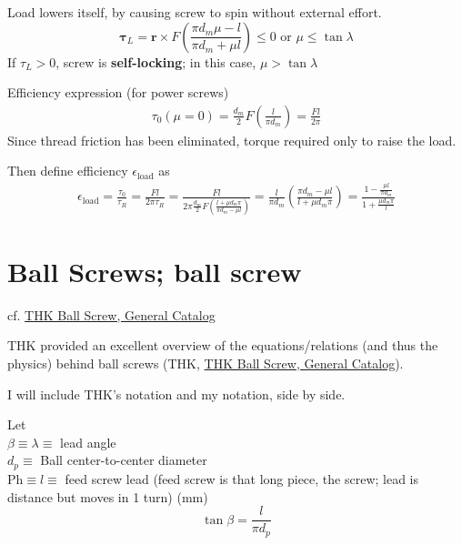 \documentclass[10pt]{amsart}
\begin{document}
\begin{multicols*}{2}
Load lowers itself, by causing screw to spin without external effort.  
\begin{equation}
	\mathbf{\tau}_L  = \mathbf{r} \times F \left( \frac{ \pi d_m \mu - l }{ \pi d_m + \mu l } \right)  \leq 0 \text{ or } \mu \leq \tan{\lambda} 
\end{equation}
If $\tau_L >0$, screw is \textbf{self-locking}; in this case, $\mu > \tan{\lambda}$

Efficiency expression (for power screws)
\begin{equation}
\begin{gathered}
	\tau_0(\mu = 0)  = \frac{d_m}{2} F\left( \frac{l }{ \pi d_m} \right)  = \frac{Fl}{2\pi }
\end{gathered}
\end{equation}
Since thread friction has been eliminated, torque required only to raise the load.  

Then define efficiency $\epsilon_{\text{load}}$ as 
\begin{equation}
\begin{gathered}
	\epsilon_{\text{load}} = \frac{ \tau_0 }{ \tau_R} = \frac{Fl}{2\pi \tau_R} = \frac{Fl}{ 2\pi  \frac{d_m}{2} F \left( \frac{ l + \mu d_m \pi }{ \pi d_m - \mu l } \right) } = \frac{l}{ \pi d_m} \left( \frac{ \pi d_m - \mu l }{ l + \mu d_m \pi } \right) = \frac{1 - \frac{ \mu l }{ \pi d_m } }{ 1 + \frac{ \mu d_m \pi }{ l }  } 
\end{gathered}
\end{equation}


\section{Ball Screws; ball screw} 

cf. \href{https://www.thk.com/sites/default/files/documents/uk_pdf/product/general/a/ee_A15.pdf}{THK Ball Screw, General Catalog}

THK provided an excellent overview of the equations/relations (and thus the physics) behind ball screws (THK, \href{https://www.thk.com/sites/default/files/documents/uk_pdf/product/general/a/ee_A15.pdf}{THK Ball Screw, General Catalog}).  

I will include THK's notation and my notation, side by side.  

Let \\
$\beta \equiv \lambda \equiv$ lead angle  \\
$d_p \equiv $ Ball center-to-center diameter \\
$\text{Ph} \equiv l \equiv $ feed screw lead (feed screw is that long piece, the screw; lead is distance but moves in 1 turn) (mm) \\
\begin{equation}
	\tan{\beta} = \frac{l}{\pi d_p} 
\end{equation}


\end{multicols*}
\end{document}
